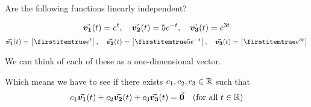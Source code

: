 \documentclass{beamer}
\begin{document}
\begin{frame}
\begin{example}
Are the following functions linearly independent?
\begin{overprint}
\begin{equation*}
{\vec{\boldsymbol{v_1}}}(t)=e^t,\quad
{\vec{\boldsymbol{v_2}}}(t)=5e^{-t},\quad
{\vec{\boldsymbol{v_3}}}(t)=e^{3t}
\end{equation*}
\begin{equation*}
\vect{v_1}(t)=\bvector{e^t},\quad
\vect{v_2}(t)=\bvector{5e^{-t}},\quad
\vect{v_3}(t)=\bvector{e^{3t}}
\end{equation*}
\end{overprint}

\vspace{2mm}
We can think of each of these as a one-dimensional vector.

Which means we have to see if there exists $c_1,c_2,c_3\in\mathbb{R}$ such that
\begin{equation*}
c_1{\vec{\boldsymbol{v_1}}}(t)+c_2{\vec{\boldsymbol{v_2}}}(t)+c_3{\vec{\boldsymbol{v_3}}}(t)={\vec{\boldsymbol{0}}}\quad (\text{for all $t\in\mathbb{R}$})
\end{equation*}


\end{example}
\end{frame}
\end{document}
